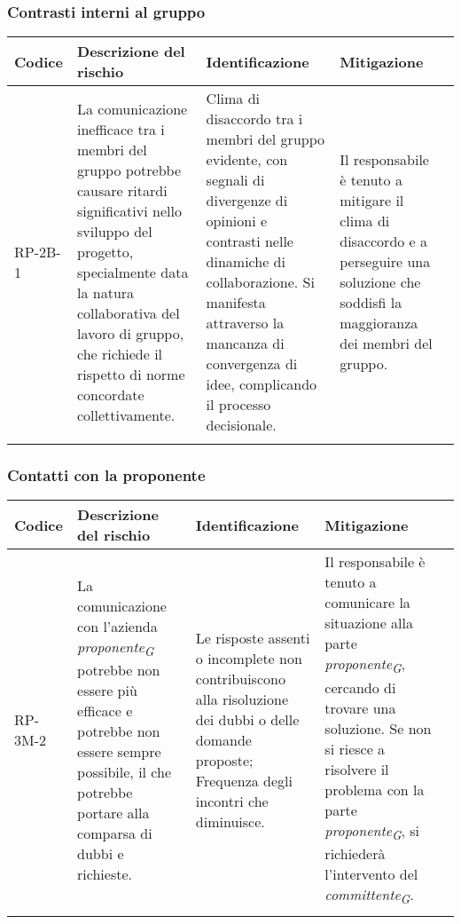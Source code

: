 \subsubsection{Contrasti interni al gruppo} \label{subsubsec:contrastiInterni}
\begin{table}[H]
    \centering
    \begin{tabularx}{\textwidth}{l>{\RaggedRight}X>{\RaggedRight}X>{\RaggedRight}X>{\RaggedRight}X}
    \toprule
    \rowcolor{gray!50}
    \textbf{Codice} & \textbf{Descrizione del rischio} & \textbf{Identificazione} & \textbf{Mitigazione} \\
    \midrule
    \addlinespace 
    RP-2B-1 & 
    La comunicazione inefficace tra i membri del gruppo potrebbe causare ritardi significativi nello sviluppo del progetto, specialmente data la natura collaborativa del lavoro di gruppo, che richiede il rispetto di norme concordate collettivamente.& 
    Clima di disaccordo tra i membri del gruppo evidente, con segnali di divergenze di opinioni e contrasti nelle dinamiche di collaborazione. Si manifesta attraverso la mancanza di convergenza di idee, complicando il processo decisionale. &
    Il responsabile è tenuto a mitigare il clima di disaccordo e a perseguire una soluzione che soddisfi la maggioranza dei membri del gruppo.\\
    \bottomrule
    \addlinespace 
    \end{tabularx}
\end{table}

\vspace{2cm}

\subsubsection{Contatti con la proponente}
\begin{table}[H]
    \centering
    \begin{tabularx}{\textwidth}{l>{\RaggedRight}X>{\RaggedRight}X>{\RaggedRight}X>{\RaggedRight}X}
    \toprule
    \rowcolor{gray!50}
    \textbf{Codice} & \textbf{Descrizione del rischio} & \textbf{Identificazione} & \textbf{Mitigazione} \\
    \midrule
    \addlinespace 
    RP-3M-2 & 
    La comunicazione con l'azienda \textit{proponente}\textsubscript{\textit{G}} potrebbe non essere più efficace e potrebbe non essere sempre possibile, il che potrebbe portare alla comparsa di dubbi e richieste. & Le risposte assenti o incomplete non contribuiscono alla risoluzione dei dubbi o delle domande proposte; Frequenza degli incontri che diminuisce. &
    Il responsabile è tenuto a comunicare la situazione alla parte \textit{proponente}\textsubscript{\textit{G}}, cercando di trovare una soluzione. Se non si riesce a risolvere il problema con la parte \textit{proponente}\textsubscript{\textit{G}}, si richiederà l’intervento del \textit{committente}\textsubscript{\textit{G}}. \\
    \bottomrule
    \addlinespace 
    \end{tabularx}
\end{table}

\pagebreak